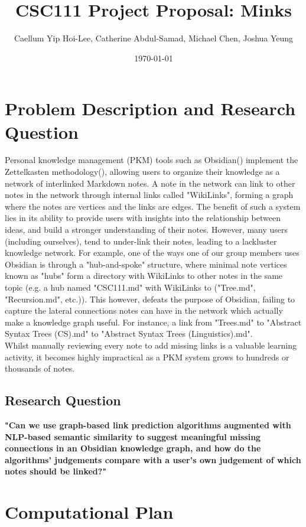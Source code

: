 \documentclass[fontsize=11pt]{article}
\title{CSC111 Project Proposal: Minks}
\author{Caellum Yip Hoi-Lee, Catherine Abdul-Samad, Michael Chen, Joshua Yeung}
\date{\today}
\begin{document}
\maketitle

\section*{Problem Description and Research Question}

Personal knowledge management (PKM) tools such as Obsidian(\cite{obsidian}) implement the Zettelkasten methodology(\cite {zettelkasten_method}), allowing users to organize their knowledge as a network of interlinked Markdown notes. A note in the network can link to other notes in the network through internal links called "WikiLinks", forming a graph where the notes are vertices and the links are edges. The benefit of such a system lies in its ability to provide users with insights into the relationship between ideas, and build a stronger understanding of their notes. However, many users (including ourselves), tend to under-link their notes, leading to a lackluster knowledge network. For example, one of the ways one of our group members uses Obsidian is through a "hub-and-spoke" structure, where minimal note vertices known as "hubs" form a directory with WikiLinks to other notes in the same topic (e.g. a hub named "CSC111.md" with WikiLinks to ("Tree.md", "Recursion.md", etc.)). This however, defeats the purpose of Obsidian, failing to capture the lateral connections notes can have in the network which actually make a knowledge graph useful. For instance, a link from "Trees.md" to "Abstract Syntax Trees (CS).md" to "Abstract Syntax Trees (Linguistics).md".\\

\noindent Whilst manually reviewing every note to add missing links is a valuable learning activity, it becomes highly impractical as a PKM system grows to hundreds or thousands of notes.

\subsection*{Research Question}
\textbf{"Can we use graph-based link prediction algorithms augmented with NLP-based semantic similarity to suggest meaningful missing connections in an Obsidian knowledge graph, and how do the algorithms' judgements compare with a user's own judgement of which notes should be linked?"}

\section*{Computational Plan}
\end{document}
